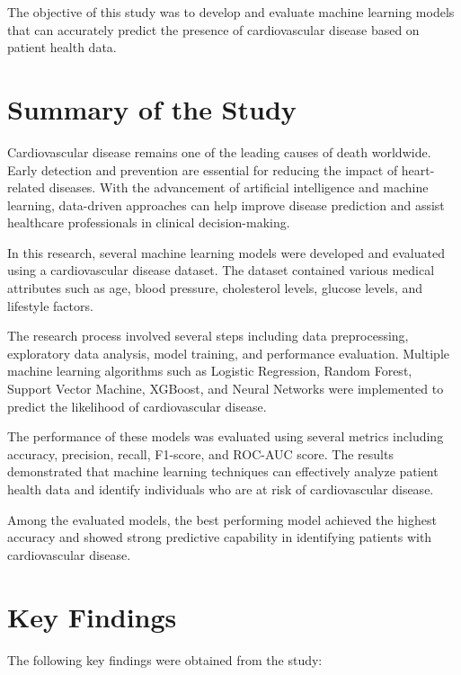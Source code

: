 The objective of this study was to develop and evaluate machine learning models that can accurately predict the presence of cardiovascular disease based on patient health data.

\section{Summary of the Study}

Cardiovascular disease remains one of the leading causes of death worldwide. Early detection and prevention are essential for reducing the impact of heart-related diseases. With the advancement of artificial intelligence and machine learning, data-driven approaches can help improve disease prediction and assist healthcare professionals in clinical decision-making.

In this research, several machine learning models were developed and evaluated using a cardiovascular disease dataset. The dataset contained various medical attributes such as age, blood pressure, cholesterol levels, glucose levels, and lifestyle factors.

The research process involved several steps including data preprocessing, exploratory data analysis, model training, and performance evaluation. Multiple machine learning algorithms such as Logistic Regression, Random Forest, Support Vector Machine, XGBoost, and Neural Networks were implemented to predict the likelihood of cardiovascular disease.

The performance of these models was evaluated using several metrics including accuracy, precision, recall, F1-score, and ROC-AUC score. The results demonstrated that machine learning techniques can effectively analyze patient health data and identify individuals who are at risk of cardiovascular disease.

Among the evaluated models, the best performing model achieved the highest accuracy and showed strong predictive capability in identifying patients with cardiovascular disease.

\section{Key Findings}

The following key findings were obtained from the study:

